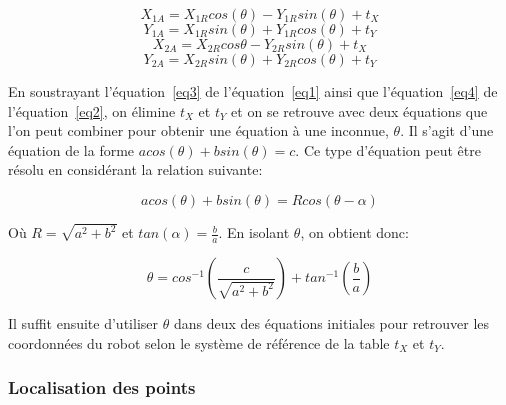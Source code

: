 \begin{equation}
\label{eq1}
X_{1A} = X_{1R}cos(\theta) - Y_{1R}sin(\theta) + t_X
\end{equation}
\begin{equation}
\label{eq2}
Y_{1A} = X_{1R}sin(\theta) + Y_{1R}cos(\theta) + t_Y
\end{equation}
\begin{equation}
\label{eq3}
X_{2A} = X_{2R}cos{\theta} - Y_{2R}sin(\theta) + t_X
\end{equation}
\begin{equation}
\label{eq4}
Y_{2A} = X_{2R}sin(\theta) + Y_{2R}cos(\theta) + t_Y
\end{equation}

En soustrayant l'équation~\ref{eq3} de l'équation~\ref{eq1} ainsi que l'équation~\ref{eq4} de l'équation~\ref{eq2}, on élimine $t_X$ et $t_Y$ et on se retrouve avec deux équations que l'on peut combiner pour obtenir une équation à une inconnue, $\theta$. Il s'agit d'une équation de la forme $a cos(\theta) + b sin(\theta) = c$. Ce type d'équation peut être résolu en considérant la relation suivante:

\begin{equation}
a cos(\theta) + b sin(\theta) = R cos(\theta - \alpha)
\end{equation}

Où $R = \sqrt{a^2 + b^2}$ et $tan(\alpha) = \frac{b}{a}$. En isolant $\theta$, on obtient donc:

\begin{equation}
\theta = cos^{-1}(\frac{c}{\sqrt{a^2 + b^2}}) + tan^{-1}(\frac{b}{a})
\end{equation} 

Il suffit ensuite d'utiliser $\theta$ dans deux des équations initiales pour retrouver les coordonnées du robot selon le système de référence de la table $t_X$ et $t_Y$.

\subsubsection{Localisation des points}

